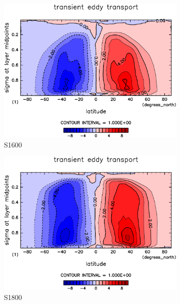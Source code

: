 \documentclass[body]{subfiles}
\begin{document}
\begin{figure}[t]
\begin{subfigure}{.4\textwidth}
		\centering
		\includegraphics[width=\textwidth]{S1600/MeriHeatTransTest@latentEn_TE,time=3650:4015-crop-rotate.pdf}
		\caption{S1600}\label{潜熱移動性擾乱S1600}
	\end{subfigure}
	\begin{subfigure}{.4\textwidth}
		\centering
		\includegraphics[width=\textwidth]{S1800/MeriHeatTransTest@latentEn_TE,time=3650:4015-crop-rotate.pdf}
		\caption{S1800}\label{潜熱移動性擾乱S1800}
	\end{subfigure}
	\begin{subfigure}{.4\textwidth}
		\centering

\end{subfigure}
\end{figure}
\end{document}
